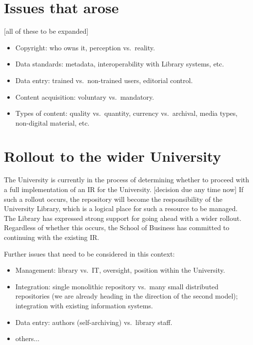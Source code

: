 \documentclass[12pt,pdftex,a4paper,titlepage]{article}
\begin{document}
\section{Issues that arose}

[all of these to be expanded]

\begin{itemize}

	\item Copyright: who owns it, perception vs.\ reality.

	\item Data standards: metadata, interoperability with Library systems, etc.

	\item Data entry: trained vs.\ non-trained users, editorial control.

	\item Content acquisition: voluntary vs.\ mandatory.

	\item Types of content: quality vs.\ quantity, currency vs.\ archival, media types, non-digital material, etc.

\end{itemize}


\section{Rollout to the wider University}

The University is currently in the process of determining whether to proceed with a full implementation of an IR for the University. [decision due any time now] If such a rollout occurs, the repository will become the responsibility of the University Library, which is a logical place for such a resource to be managed. The Library has expressed strong support for going ahead with a wider rollout. Regardless of whether this occurs, the School of Business has committed to continuing with the existing IR.

Further issues that need to be considered in this context:


\begin{itemize}

	\item Management: library vs.\ IT, oversight, position within the University.

	\item Integration: single monolithic repository vs.\ many small distributed repositories (we are already heading in the direction of the second model); integration with existing information systems.

	\item Data entry: authors (self-archiving) vs.\ library staff.

	\item others...

\end{itemize}
\end{document}
